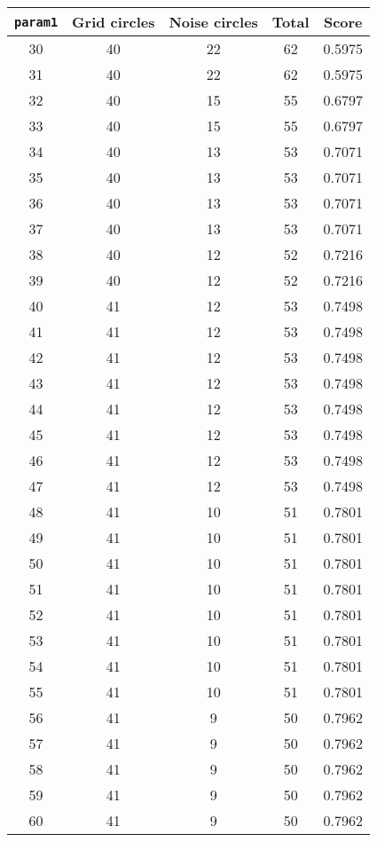 \documentclass[letterpaper, 12pt]{article}
\begin{document}
\begin{longtable}{|c|c|c|c|c|}
\hline
\textbf{\texttt{param1}} & \textbf{Grid circles} & \textbf{Noise circles} & \textbf{Total} & \textbf{Score} \\
\hline
30 & 40 & 22 & 62 & 0.5975 \\
\hline
31 & 40 & 22 & 62 & 0.5975 \\
\hline
32 & 40 & 15 & 55 & 0.6797 \\
\hline
33 & 40 & 15 & 55 & 0.6797 \\
\hline
34 & 40 & 13 & 53 & 0.7071 \\
\hline
35 & 40 & 13 & 53 & 0.7071 \\
\hline
36 & 40 & 13 & 53 & 0.7071 \\
\hline
37 & 40 & 13 & 53 & 0.7071 \\
\hline
38 & 40 & 12 & 52 & 0.7216 \\
\hline
39 & 40 & 12 & 52 & 0.7216 \\
\hline
40 & 41 & 12 & 53 & 0.7498 \\
\hline
41 & 41 & 12 & 53 & 0.7498 \\
\hline
42 & 41 & 12 & 53 & 0.7498 \\
\hline
43 & 41 & 12 & 53 & 0.7498 \\
\hline
44 & 41 & 12 & 53 & 0.7498 \\
\hline
45 & 41 & 12 & 53 & 0.7498 \\
\hline
46 & 41 & 12 & 53 & 0.7498 \\
\hline
47 & 41 & 12 & 53 & 0.7498 \\
\hline
48 & 41 & 10 & 51 & 0.7801 \\
\hline
49 & 41 & 10 & 51 & 0.7801 \\
\hline
50 & 41 & 10 & 51 & 0.7801 \\
\hline
51 & 41 & 10 & 51 & 0.7801 \\
\hline
52 & 41 & 10 & 51 & 0.7801 \\
\hline
53 & 41 & 10 & 51 & 0.7801 \\
\hline
54 & 41 & 10 & 51 & 0.7801 \\
\hline
55 & 41 & 10 & 51 & 0.7801 \\
\hline
56 & 41 & 9 & 50 & 0.7962 \\
\hline
57 & 41 & 9 & 50 & 0.7962 \\
\hline
58 & 41 & 9 & 50 & 0.7962 \\
\hline
59 & 41 & 9 & 50 & 0.7962 \\
\hline
60 & 41 & 9 & 50 & 0.7962 \\

\end{longtable}
\end{document}
